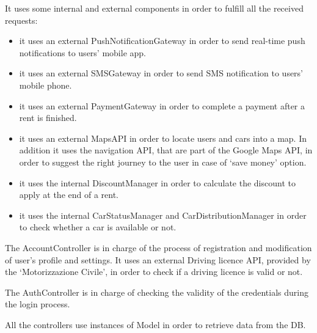 It uses some internal and external components in order to fulfill all the received requests:
\begin{itemize}
\item it uses an external PushNotificationGateway in order to send real-time push notifications to users’ mobile app.
\item it uses an external SMSGateway in order to send SMS notification to users’ mobile phone.
\item it uses an external PaymentGateway in order to complete a payment after a rent is finished.
\item it uses an external MapsAPI in order to locate users and cars into a map. In addition it uses the navigation API, that are part of the Google Maps API, in order to suggest the right journey to the user in case of ‘save money’ option.
\item it uses the internal DiscountManager in order to calculate the discount to apply at the end of a rent.
\item it uses the internal CarStatusManager and CarDistributionManager in order to check whether a car is available or not.
\end{itemize}

The AccountController is in charge of the process of registration and modification of user’s profile and settings.
It uses an external Driving licence API, provided by the ‘Motorizzazione Civile’, in order to check if a driving licence is valid or not.

The AuthController is in charge of checking the validity of the credentials during the login process.

All the controllers use instances of Model in order to retrieve data from the DB.

